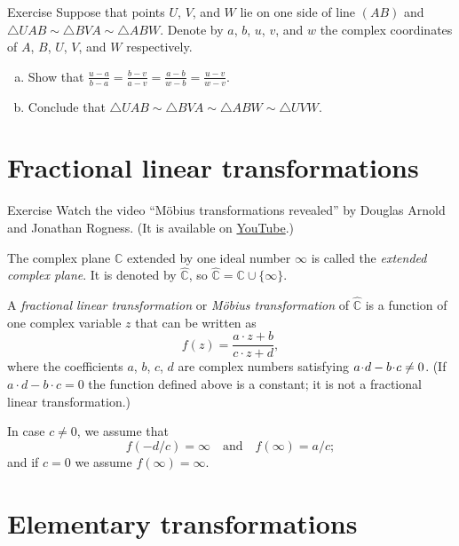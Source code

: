 \medskip

\begin{thm}{Exercise}\label{ex:4-sim}
Suppose that points $U$, $V$, and $W$ lie on one side of line $(AB)$ and 
$\triangle UAB\sim \triangle BVA \sim \triangle ABW$.
Denote by $a$, $b$, $u$, $v$, and $w$ the complex coordinates of $A$, $B$, $U$, $V$, and $W$ respectively.
\begin{enumerate}[(a)]
 \item Show that $\tfrac{u-a}{b-a}=\tfrac{b-v}{a-v}=\tfrac{a-b}{w-b}=\tfrac{u-v}{w-v}$.
 \item Conclude that $\triangle UAB\sim \triangle BVA \sim \triangle ABW\sim \triangle UVW$.
\end{enumerate}
 
\end{thm}

\section{Fractional linear transformations}

\begin{thm}{Exercise}\label{ex:movie}
Watch the video ``Möbius transformations revealed'' by Douglas Arnold and Jonathan Rogness.
(It is available on \href{http://youtu.be/JX3VmDgiFnY}{YouTube}.)
\end{thm}


The complex plane $\mathbb{C}$ extended by one ideal number $\infty$ 
is called the \emph{extended complex plane}.
It is denoted by $\hat{\mathbb{C}}$, so $\hat{\mathbb{C}}=\mathbb{C}\cup\{\infty\}$.

A \emph{fractional linear transformation} or \emph{M\"obius transformation} of  $\hat{\mathbb{C}}$ is a function of one complex variable $z$
that can be written as
$$f(z) = \frac{a\cdot z + b}{c\cdot z + d},$$
where the coefficients $a$, $b$, $c$, $d$ are complex numbers satisfying $a\cdot d \z- b\cdot c \not= 0$.
(If $a\cdot d - b\cdot c = 0$ the function defined above is a constant; it is not a fractional linear transformation.) 

In case $c\not=0$, we assume that
$$f(-d/c) = \infty
\quad
\text{and}
\quad
f(\infty) = a/c;$$
and if $c=0$ we assume
$f(\infty) = \infty$.

\section{Elementary transformations}

